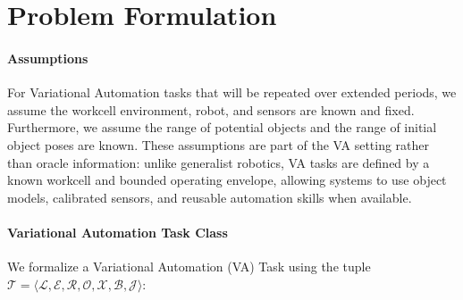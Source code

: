 \section{Problem Formulation}

\paragraph{Assumptions}
For Variational Automation tasks that will be repeated over extended periods, we assume the workcell environment, robot, and sensors are known and fixed. Furthermore, we assume the range of potential objects and the range of initial object poses are known. These assumptions are part of the VA setting rather than oracle information: unlike generalist robotics, VA tasks are defined by a known workcell and bounded operating envelope, allowing systems to use object models, calibrated sensors, and reusable automation skills when available.

\paragraph{Variational Automation Task Class}
We formalize a Variational Automation (VA) Task using the tuple $\mathcal{T} = \langle \mathcal{L}, \mathcal{E}, \mathcal{R}, \mathcal{O}, \mathcal{X}, \mathcal{B}, \mathcal{J} \rangle$:

